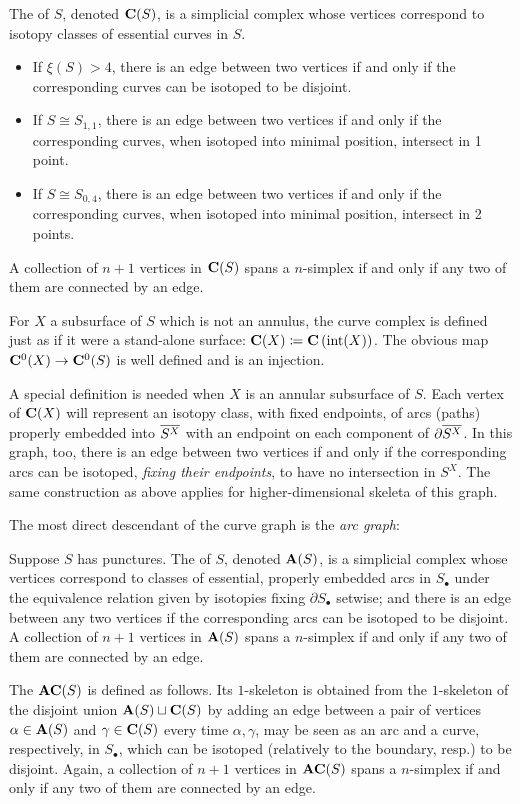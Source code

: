 \begin{defin}
The  of $S$, denoted $\mathbf C(S)$, is a simplicial complex whose vertices correspond to isotopy classes of essential curves in $S$.
\begin{itemize}
\item If $\xi(S)> 4$, there is an edge between two vertices if and only if the corresponding curves can be isotoped to be disjoint.
\item If $S\cong S_{1,1}$, there is an edge between two vertices if and only if the corresponding curves, when isotoped into minimal position, intersect in 1 point.
\item If $S\cong S_{0,4}$, there is an edge between two vertices if and only if the corresponding curves, when isotoped into minimal position, intersect in 2 points.
\end{itemize}
A collection of $n+1$ vertices in $\mathbf C(S)$ spans a $n$-simplex if and only if any two of them are connected by an edge.

For $X$ a subsurface of $S$ which is not an annulus, the curve complex is defined just as if it were a stand-alone surface: $\mathbf C(X)\coloneqq \mathbf C\left(\mathrm{int}(X)\right)$. The obvious map $\mathbf C^0(X)\rightarrow \mathbf C^0(S)$ is well defined and is an injection.

A special definition is needed when $X$ is an annular subsurface of $S$. Each vertex of $\mathbf C(X)$ will represent an isotopy class, with fixed endpoints, of arcs (paths) properly embedded into $\overline{S^X}$ with an endpoint on each component of $\partial\overline{S^X}$. In this graph, too, there is an edge between two vertices if and only if the corresponding arcs can be isotoped, \emph{fixing their endpoints}, to have no intersection in $S^X$. The same construction as above applies for higher-dimensional skeleta of this graph.
\end{defin}

The most direct descendant of the curve graph is the \emph{arc graph}:

\begin{defin}
Suppose $S$ has punctures. The  of $S$, denoted $\mathbf A(S)$, is a simplicial complex whose vertices correspond to classes of essential, properly embedded arcs in $S_\bullet$ under the equivalence relation given by isotopies fixing $\partial S_\bullet$ setwise; and there is an edge between any two vertices if the corresponding arcs can be isotoped to be disjoint. A collection of $n+1$ vertices in $\mathbf A(S)$ spans a $n$-simplex if and only if any two of them are connected by an edge.

The  $\mathbf{AC}(S)$ is defined as follows. Its $1$-skeleton is obtained from the $1$-skeleton of the disjoint union $\mathbf A(S)\sqcup\mathbf C(S)$ by adding an edge between a pair of vertices $\alpha\in\mathbf A(S)$ and $\gamma\in\mathbf C(S)$ every time $\alpha,\gamma$, may be seen as an arc and a curve, respectively, in $S_\bullet$, which can be isotoped (relatively to the boundary, resp.) to be disjoint. Again, a collection of $n+1$ vertices in $\mathbf{AC}(S)$ spans a $n$-simplex if and only if any two of them are connected by an edge.
\end{defin}

